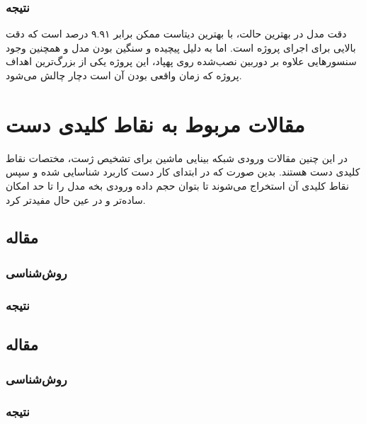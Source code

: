 \subsubsection{نتیجه}
دقت مدل در بهترین حالت، با بهترین دیتاست ممکن برابر ۹.۹۱ درصد است که دقت بالایی برای اجرای پروژه است. اما به دلیل پیچیده و سنگین بودن مدل و همچنین وجود سنسور‌هایی علاوه بر دوربین نصب‌شده روی پهپاد، این پروژه یکی از بزرگ‌ترین اهداف پروژه که زمان واقعی بودن آن است دچار چالش می‌شود.\cite{perera2018uav}




\section{مقالات مربوط به نقاط کلیدی دست}
در این چنین مقالات ورودی شبکه بینایی ماشین برای تشخیص ژست، مختصات نقاط کلیدی دست هستند. بدین صورت که در ابتدای کار دست کاربرد شناسایی شده و سپس نقاط کلیدی آن استخراج می‌شوند تا بتوان حجم داده ورودی بخه مدل را تا حد امکان ساده‌تر و در عین حال مفیدتر کرد.


\subsection{مقاله }

\subsubsection{روش‌شناسی}

\subsubsection{نتیجه}
\cite{murugeswari2014hand}


\subsection{مقاله }

\subsubsection{روش‌شناسی}

\subsubsection{نتیجه}
\cite{dang2022improved}


